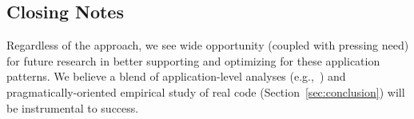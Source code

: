 





\subsection{Closing Notes}

Regardless of the approach, we see wide opportunity (coupled with
pressing need) for future research in better supporting and optimizing
for these application patterns. We believe a blend of
application-level analyses (e.g.,~\cite{statusquo,coord-avoid}) and
pragmatically-oriented empirical study of real code
(Section~\ref{sec:conclusion}) will be instrumental to success.
